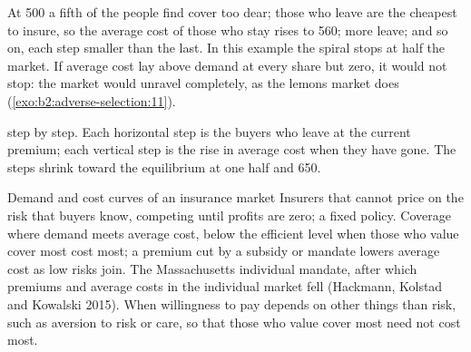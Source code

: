 \label{out:b2:adverse-selection:unravelling}

At 500 a fifth of the people find cover too dear; those who leave are the cheapest to insure, so the average cost of
those who stay rises to 560; more leave; and so on, each step smaller than the last. In this example the spiral stops at
half the market. If average cost lay above demand at every share but zero, it would not stop: the market would unravel
completely, as the lemons market does (\cref{exo:b2:adverse-selection:11}).

\begin{omfigure}

{\small {} step by step. Each horizontal step is the buyers who leave at the current premium; each vertical step
is the rise in average cost when they have gone. The steps shrink toward the equilibrium at one half and 650.}
\end{omfigure}

\begin{model}{Demand and cost curves of an insurance market}
\assumes Insurers that cannot price on the risk that buyers know, competing until profits are zero; a fixed policy.
\predicts Coverage where demand meets average cost, below the efficient level when those who value cover most cost
most; a premium cut by a subsidy or mandate lowers average cost as low risks join.
\tested The Massachusetts individual mandate, after which premiums and average costs in the individual market
fell (Hackmann, Kolstad and Kowalski 2015).
\breaks When willingness to pay depends on other things than risk, such as aversion to risk or care, so that those who
value cover most need not cost most.
\end{model}

